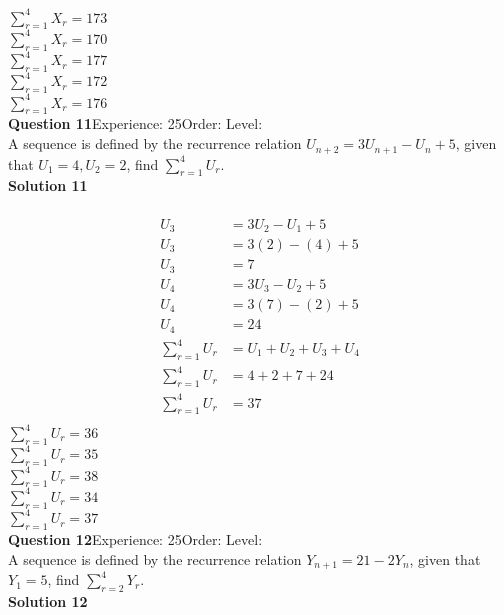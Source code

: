 \documentclass{article}
\begin{document}
$\displaystyle\sum_{r=1}^{4} X_r=173$\\
$\displaystyle\sum_{r=1}^{4} X_r=170$\\
$\displaystyle\sum_{r=1}^{4} X_r=177$\\
$\displaystyle\sum_{r=1}^{4} X_r=172$\\
$\displaystyle\sum_{r=1}^{4} X_r=176$\\
\noindent\textbf{Question 11}\hspace{20pt}Experience: 25\hspace{20pt}Order: \hspace{20pt}Level: \\[2pt]
A sequence is defined by the recurrence relation $U_{n+2}=3U_{n+1}-U_n+5$, given that  $U_1 =4,U_2=2$, find $\displaystyle\sum_{r=1}^{4} U_r$.\\[4pt]
\noindent\textbf{Solution 11}\\[2pt]
\\[-10pt]\begin{align*}
U_3&=3U_2-U_1+5\\[2pt]
U_3&=3(2)-(4)+5\\[2pt]
U_3&=7\\[12pt]
U_4&=3U_3-U_2+5\\[2pt]
U_4&=3(7)-(2)+5\\[2pt]
U_4&=24\\[12pt]
\displaystyle\sum_{r=1}^{4} U_r&=U_1+U_2+U_3+U_4\\[2pt]
\displaystyle\sum_{r=1}^{4} U_r&=4+2+7+24\\[2pt]
\displaystyle\sum_{r=1}^{4} U_r&=37\\[2pt]
\end{align*}
$\displaystyle\sum_{r=1}^{4} U_r=36$\\
$\displaystyle\sum_{r=1}^{4} U_r=35$\\
$\displaystyle\sum_{r=1}^{4} U_r=38$\\
$\displaystyle\sum_{r=1}^{4} U_r=34$\\
$\displaystyle\sum_{r=1}^{4} U_r=37$\\
\noindent\textbf{Question 12}\hspace{20pt}Experience: 25\hspace{20pt}Order: \hspace{20pt}Level: \\[2pt]
A sequence is defined by the recurrence relation $Y_{n+1}=21-2Y_n$, given that  $Y_1 =5$, find $\displaystyle\sum_{r=2}^{4} Y_r$.\\[4pt]
\noindent\textbf{Solution 12}\\[2pt]
\end{document}
